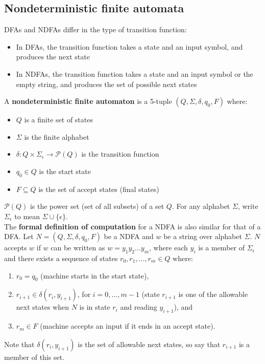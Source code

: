 \documentclass{article}
\begin{document}
\subsection{Nondeterministic finite automata}
DFAs and NDFAs differ in the type of transition function:
\begin{itemize}
	\item In DFAs, the transition function takes a state and an input symbol, and produces the next state
	\item In NDFAs, the transition function takes a state and an input symbol or the empty string, and produces the set of possible next states
\end{itemize}
A \textbf{nondeterministic finite automaton} is a 5-tuple $(Q, \Sigma, \delta, q_0, F)$ where:
\begin{itemize}
	\item $Q$ is a finite set of states
	\item $\Sigma$ is the finite alphabet
	\item $\delta: Q\times\Sigma_{\epsilon} \rightarrow \mathcal{P}(Q)$ is the transition function
	\item $q_0 \in Q$ is the start state
	\item $F \subseteq Q$ is the set of accept states (final states)
\end{itemize}
$\mathcal{P}(Q)$ is the power set (set of all subsets) of a set $Q$. For any alphabet $\Sigma$, write $\Sigma_{\epsilon}$ to mean $\Sigma \cup \{\epsilon\}$.\medskip
\\The \textbf{formal definition of computation} for a NDFA is also similar for that of a DFA. Let $N = (Q, \Sigma, \delta, q_0, F)$ be a NDFA and $w$ be a string over alphabet $\Sigma$. $N$ accepts $w$ if $w$ can be written as $w = y_1y_2...y_m$, where each $y_i$ is a member of $\Sigma_{\epsilon}$ and there exists a sequence of states $r_0, r_1, ..., r_m \in Q$ where:
\begin{enumerate}
	\item $r_0 = q_0$ (machine starts in the start state),
	\item $r_{i+1} \in \delta(r_i, y_{i+1})$, for $i = 0, ..., m-1$ (state $r_{i+1}$ is one of the allowable next states when $N$ is in state $r_i$ and reading $y_{i+1}$), and
	\item $r_m \in F$ (machine accepts an input if it ends in an accept state).
\end{enumerate}
Note that $\delta(r_i, y_{i+1})$ is the set of allowable next states, so say that $r_{i+1}$ is a member of this set.
\end{document}
